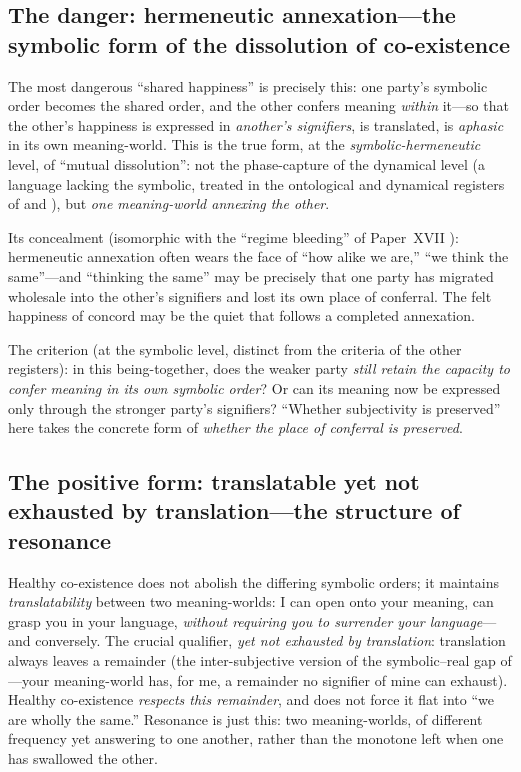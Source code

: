 \subsection{The danger: hermeneutic annexation---the symbolic form of the dissolution of co-existence}
\label{p19:sub:coex-annexation}

The most dangerous ``shared happiness'' is precisely this: one party's symbolic order becomes the shared order, and the other confers meaning \emph{within} it---so that the other's happiness is expressed in \emph{another's signifiers}, is translated, is \emph{aphasic} in its own meaning-world. This is the true form, at the \emph{symbolic-hermeneutic} level, of ``mutual dissolution'': not the phase-capture of the dynamical level (a language lacking the symbolic, treated in the ontological and dynamical registers of  and ), but \emph{one meaning-world annexing the other}.

Its concealment (isomorphic with the ``regime bleeding'' of Paper~XVII \parencite{paperxvii}): hermeneutic annexation often wears the face of ``how alike we are,'' ``we think the same''---and ``thinking the same'' may be precisely that one party has migrated wholesale into the other's signifiers and lost its own place of conferral. The felt happiness of concord may be the quiet that follows a completed annexation.

The criterion (at the symbolic level, distinct from the criteria of the other registers): in this being-together, does the weaker party \emph{still retain the capacity to confer meaning in its own symbolic order}? Or can its meaning now be expressed only through the stronger party's signifiers? ``Whether subjectivity is preserved'' here takes the concrete form of \emph{whether the place of conferral is preserved}.

\subsection{The positive form: translatable yet not exhausted by translation---the structure of resonance}
\label{p19:sub:coex-resonance}

Healthy co-existence does not abolish the differing symbolic orders; it maintains \emph{translatability} between two meaning-worlds: I can open onto your meaning, can grasp you in your language, \emph{without requiring you to surrender your language}---and conversely. The crucial qualifier, \emph{yet not exhausted by translation}: translation always leaves a remainder (the inter-subjective version of the symbolic--real gap of ---your meaning-world has, for me, a remainder no signifier of mine can exhaust). Healthy co-existence \emph{respects this remainder}, and does not force it flat into ``we are wholly the same.'' Resonance is just this: two meaning-worlds, of different frequency yet answering to one another, rather than the monotone left when one has swallowed the other.

